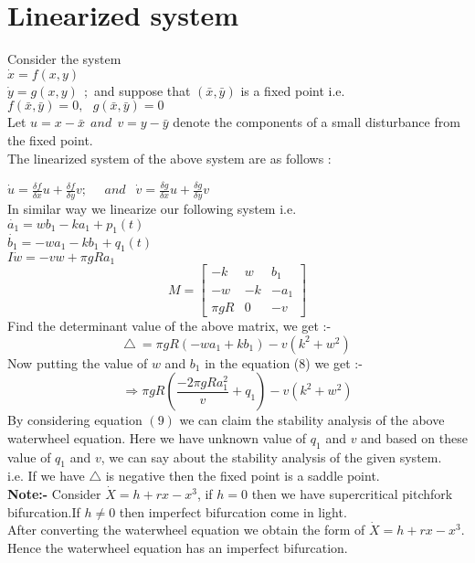 \documentclass[12pt]{article}
\begin{document}
\section*{Linearized system}
Consider the system\\
$ \dot{x}=f(x,y)$\\
$ \dot{y}=g(x,y)~~;$ and suppose that $(\bar{x}, \bar{y})$ is a fixed point i.e.
$ f(\bar{x},\bar{y})=0,~~~ g(\bar{x},\bar{y})=0$\\
Let $ u=x-\bar{x} ~~and~~ v=y-\bar{y}$ denote the components of a small disturbance from the fixed point.\\
The linearized system of the above system are as follows :

$\dot{u}=\frac{\delta f}{\delta x}u+\frac{\delta f}{\delta y}v;~~~~~~ and~~$
$\dot{v}=\frac{\delta g}{\delta x}u+\frac{\delta g}{\delta y}v$\\
In similar way we linearize our following system i.e.\\
$\dot{a_1}=wb_1-ka_1+p_1(t)$\\
$\dot{b_1}=-wa_1-kb_1+q_1(t)$\\
$I\dot{w}=-vw+ \pi gRa_1$\\

\[
   M=
  \left[ {\begin{array}{ccc}
   -k & w & b_1 \\
   -w & -k & -a_1 \\
   \pi gR & 0 & -v
  \end{array} } \right]
\]
Find the determinant value of the above matrix, we get :-\\
\begin{equation}
 \triangle~= \pi gR(-wa_1+kb_1)-v(k^2+w^2)
\end{equation}
Now putting the value of $w$ and $b_1$ in the equation (8) we get :-\\
\begin{equation}
 \Rightarrow \pi gR(\frac{-2\pi gRa_1^2}{v}+q_1)-v(k^2+w^2)
\end{equation}
By considering equation $(9)$ we can claim the stability analysis of the above waterwheel equation. Here we have unknown value of $q_1$ and $v$ and based on these value of $q_1$ and $v$, we can say about the stability analysis of the given system.\\
i.e. If we have $\triangle$ is negative then the fixed point is a saddle point.\\
\textbf{Note:-}  Consider $ \dot{X}=h+rx-x^3$, if $h=0$ then we have supercritical pitchfork bifurcation.If $h \neq 0$ then imperfect bifurcation come in light.\\
After converting the waterwheel equation we obtain the form of  $ \dot{X}=h+rx-x^3$. Hence the waterwheel equation has an imperfect bifurcation.
\end{document}
